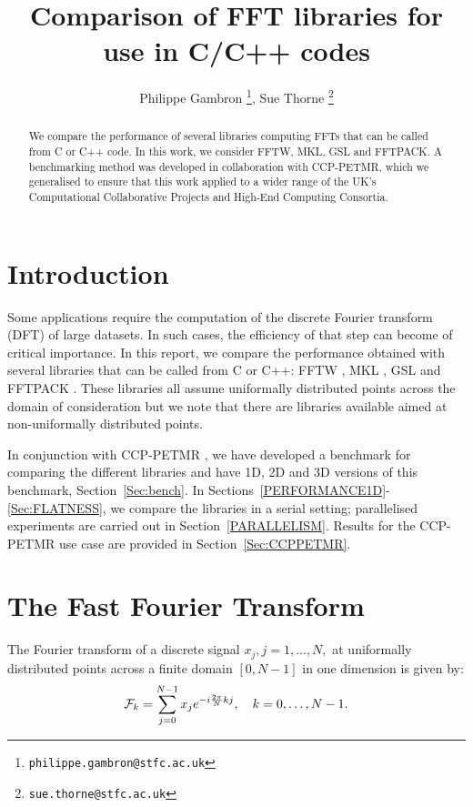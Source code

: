 \documentclass[12pt, a4paper]{article} \setlength{\textheight}{24cm}
\begin{document}
\title{Comparison of FFT libraries for use in C/C++ codes} \author{Philippe
  Gambron \thanks{\texttt{philippe.gambron{@}stfc.ac.uk}}, Sue Thorne
  \thanks{\texttt{sue.thorne{@}stfc.ac.uk}}} 
\maketitle
\begin{abstract}
  We compare the performance of several libraries computing FFTs that
  can be called from C or C++ code. In this work, we consider FFTW,
  MKL, GSL and FFTPACK. A benchmarking method was developed in
  collaboration with CCP-PETMR, which we generalised to ensure that
  this work applied to a wider range of the UK's Computational
  Collaborative Projects and High-End Computing Consortia.
\end{abstract}
\section{Introduction}
Some applications require the computation of the discrete Fourier
transform (DFT) of large datasets. In such cases, the efficiency of
that step can become of critical importance. In this report, we
compare the performance obtained with several libraries that can be
called from C or C++: FFTW \cite{fftw}, MKL \cite{mkl}, GSL \cite{gsl}
and FFTPACK \cite{fftpack}. These libraries all assume uniformally
distributed points across the domain of consideration but we note that
there are libraries available aimed at non-uniformally distributed
points.

In conjunction with CCP-PETMR \cite{bibccppetmr}, we have developed a
benchmark for comparing the different libraries and have 1D, 2D and 3D
versions of this benchmark, Section~\ref{Sec:bench}. In
Sections~\ref{PERFORMANCE1D}-\ref{Sec:FLATNESS}, we compare the
libraries in a serial setting; parallelised experiments are carried
out in Section~\ref{PARALLELISM}. Results for the CCP-PETMR use case
are provided in Section~\ref{Sec:CCPPETMR}.

\section{The Fast Fourier Transform}

The Fourier transform of a discrete signal $x_j, j=1,\ldots,N,$ at
uniformally distributed points across a finite domain $[0,N-1]$ in
one dimension is given by:
\begin{equation}\label{fourier} {\cal F}_k=\sum_{j=0}^{N-1} x_j
  e^{-i\frac{2\pi}{N}kj}, \quad k=0,\ldots,N-1.
\end{equation}
\end{document}
